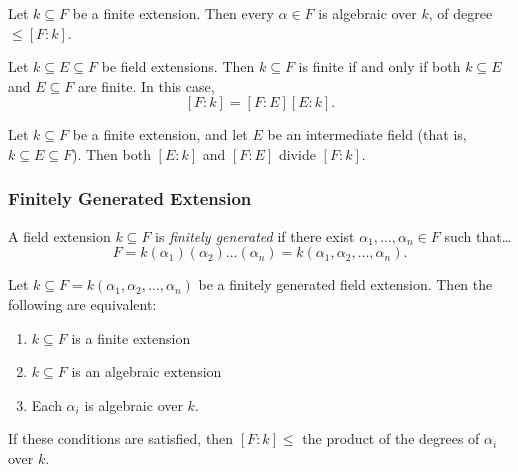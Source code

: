 \begin{lemma}
Let $k \subseteq F$ be a finite extension. Then every $\alpha \in F$ is algebraic over $k$, of degree $\leq [F:k]$.
\end{lemma}

\begin{proposition}
Let $k \subseteq E \subseteq F$ be field extensions. Then $k \subseteq F$ is finite if and only if both $k\subseteq E$ and $E \subseteq F$
are finite. In this case,
$$[F:k] = [F:E][E:k].$$
\end{proposition}

\begin{corollary}
Let $k \subseteq F$ be a finite extension, and let $E$ be an intermediate field (that is, $k \subseteq E \subseteq F$).
Then both $[E : k]$ and $[F : E]$ divide $[F : k]$.
\end{corollary}

\subsubsection{Finitely Generated Extension}\label{finitelygenext}
A field extension $k \subseteq F$ is \emph{finitely generated} if there exist $\alpha_1, \dots, \alpha_n \in F$ such that\dots
$$F = k(\alpha_1)(\alpha_2)\dots(\alpha_n) = k(\alpha_1,\alpha_2,\dots,\alpha_n).$$

\begin{proposition}
Let $k \subseteq F = k(\alpha_1,\alpha_2,\dots,\alpha_n)$ be a finitely generated field extension. Then the
following are equivalent:
\begin{enumerate}
\item $k \subseteq F$ is a finite extension
\item $k \subseteq F$ is an algebraic extension
\item Each $\alpha_i$ is algebraic over $k$.
\end{enumerate}
If these conditions are satisfied, then $[F : k] \leq$ the product of the degrees of $\alpha_i$ over $k$.
\end{proposition}